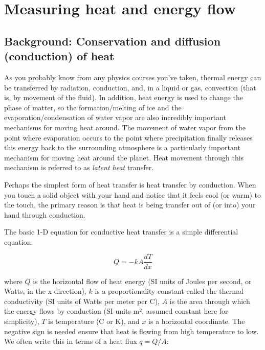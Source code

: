 \setchapterpreamble[u]{\margintoc}
\chapter{Measuring heat and energy flow}

\section{Background: Conservation and diffusion (conduction) of heat}
\label{sec:diffusion}

As you probably know from any physics courses you’ve taken, thermal energy can be transferred by radiation, conduction, and, in a liquid or gas, convection (that is, by movement of the fluid).
In addition, heat energy is used to change the phase of matter, so the formation/melting of ice and the evaporation/condensation of water vapor are also incredibly important mechanisms for moving heat around.
The movement of water vapor from the point where evaporation occurs to the point where precipitation finally releases this energy back to the surrounding atmosphere is a particularly important mechanism for moving heat around the planet.
Heat movement through this mechanism is referred to as \emph{latent heat} transfer.

Perhaps the simplest form of heat transfer is heat transfer by conduction.
When you touch a solid object with your hand and notice that it feels cool (or warm) to the touch, the primary reason is that heat is being transfer out of (or into) your hand through conduction.  

The basic 1-D equation for conductive heat transfer is a simple differential equation:

\begin{equation} \label{eq:conduction} 
Q =-kA\frac{dT}{dx}
\end{equation}

where $Q$ is the horizontal flow of heat energy (SI units of Joules per second, or Watts, in the x direction), $k$ is a proportionality constant called the thermal conductivity (SI units of Watts per meter per \textdegree C), $A$ is the area through which the energy flows by conduction (SI units m², assumed constant here for simplicity), $T$ is temperature (\textdegree C or K), and $x$ is a horizontal coordinate.
The negative sign is needed ensure that heat is flowing from high temperature to low.
We often write this in terms of a heat flux $q=Q/A$:

